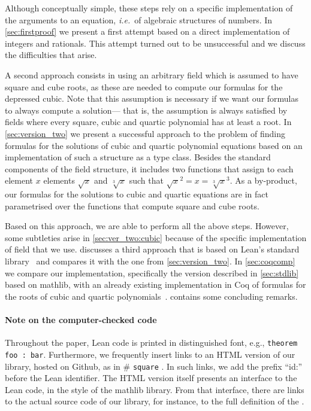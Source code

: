 \documentclass{article} %
\makeatletter
\newcommand{\linkprefix}{id:}
\newcommand{\coqdocbaseurl}{https://NicholasDyson.github.io/non-mathlib/}
\newcommand{\urlhash}{\#}
\newcommand{\coqdocurl}[2]{\coqdocbaseurl #1.html\urlhash #2}
\newcommand{\nolinkcoqident}[1]{\nolinkurl{#1}} %
\newcommand{\coqident}{\begingroup\@makeother\#\@coqident}
\newcommand{\@coqident}[3][]{%
  \ifthenelse{\isempty{#2}}%
  {\nolinkcoqident{#3}}%
  {\ifthenelse{\isempty{#1}}%
  {\href{\coqdocurl{#2}{#3}}{\color{blue}{\nolinkcoqident{\linkprefix #3}}}}%
  {\href{\coqdocurl{#2}{#3}}{\nolinkcoqident{#1}}}}%
\endgroup}
\theoremstyle{plain}
\theoremstyle{definition}
\newcommand{\Lean}{\textsf{Lean}\xspace}
\newcommand{\mathlib}{\textsf{mathlib}\xspace}
\makeatother
\begin{document}
Although conceptually simple,
these steps rely on a specific implementation of the arguments
to an equation, \textit{i.e.}\ of algebraic structures of numbers.
In \cref{sec:firstproof} we present a first attempt 
based on a direct implementation of integers and rationals.
This attempt turned out to be unsuccessful and
we discuss the difficulties that arise.

A second approach consists in using an arbitrary field
which is assumed to have square and cube roots,
as these are needed to compute our formulas for the depressed cubic.
Note that this assumption is necessary
if we want our formulas to always compute a solution---%
that is, the assumption is always satisfied by fields
where every square, cubic and quartic polynomial has at least a root.
In \cref{sec:version_two} we present a successful approach
to the problem of finding formulas for the solutions of cubic and quartic polynomial equations
based on an implementation of such a structure as a type class.
Besides the standard components of the field structure,
it includes two functions
that assign to each element $x$ elements $\sqrt{x}$ and $\sqrt[3]{x}$
such that $\sqrt{x}^2 = x = \sqrt[3]{x}^3$.
As a by-product, our formulas for the solutions to cubic and quartic equations are in fact parametrised
over the functions that compute square and cube roots.

Based on this approach, we are able to perform all the above steps.
However, some subtleties arise in \cref{sec:ver_two:cubic}
because of the specific implementation of field that we use.
 discusses a third approach that is based on
Lean's standard library~\cite{lean_mathlib}
and compares it with the one from \cref{sec:version_two}.
In \cref{sec:coqcomp} we compare our implementation, specifically
the version described in \cref{sec:stdlib} based on \mathlib,
with an already existing implementation in Coq of formulas
for the roots of cubic and quartic polynomials~\cite{coq_proof}.
 contains some concluding remarks.


\paragraph*{Note on the computer-checked code} 
Throughout the paper, \Lean code is printed in distinguished font, e.g., \lstinline!theorem foo : bar!. 
Furthermore, we frequently insert links to an HTML version of our library, hosted on Github, as in \coqident{field_definition}{square}. 
In such links, we add the prefix ``\linkprefix'' before the \Lean identifier.
The HTML version itself presents an interface to the Lean code, in the style of the \mathlib library. From that interface, there are links to the actual source code of our library, for instance, to the full definition of the \href{https://github.com/anonymousLeanDocsHosting/lean-polynomials/blob/main/non-mathlib/field_definition.lean#L23}{\color{blue}{\lstinline!square! function}}.
\end{document}
